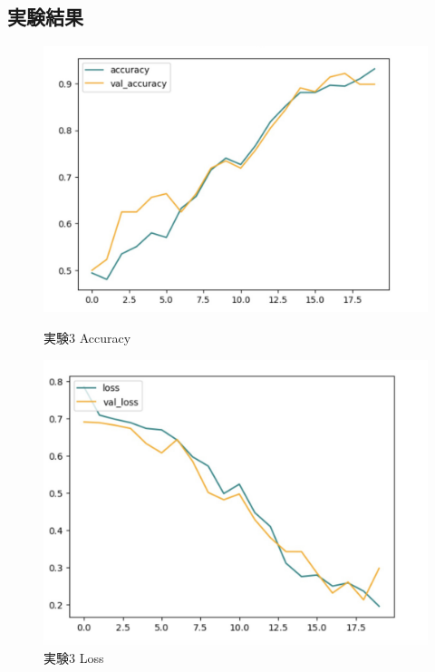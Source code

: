 \documentclass[a4paper, 11pt, titlepage]{jsarticle}
\begin{document}
\subsection{実験結果}
\begin{figure}[htbp]
  \begin{minipage}[b]{0.45\linewidth}
    \centering
    \includegraphics[keepaspectratio, scale=0.161]{ex3_acc.jpg}
    \caption{実験3 Accuracy}
  \end{minipage}
  \begin{minipage}[b]{0.45\linewidth}
    \centering
    \includegraphics[keepaspectratio, scale=0.161]{ex3_loss.jpg}
    \caption{実験3 Loss}
  \end{minipage}
\end{figure}
\end{document}
